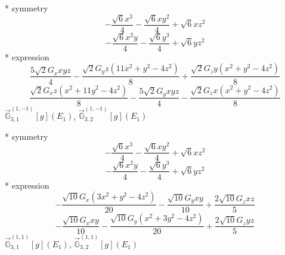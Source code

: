 \documentclass[fleqn,8pt]{jsarticle}
\begin{document}
\noindent\quad ** symmetry
\begin{dmath*}
- \frac{\sqrt{6} x^{3}}{4} - \frac{\sqrt{6} x y^{2}}{4} + \sqrt{6} x z^{2}
\end{dmath*}
\begin{dmath*}
- \frac{\sqrt{6} x^{2} y}{4} - \frac{\sqrt{6} y^{3}}{4} + \sqrt{6} y z^{2}
\end{dmath*}
\noindent\quad ** expression
\begin{dmath*}
\frac{5 \sqrt{2} G_{x} x y z}{4} - \frac{\sqrt{2} G_{y} z \left(11 x^{2} + y^{2} - 4 z^{2}\right)}{8} + \frac{\sqrt{2} G_{z} y \left(x^{2} + y^{2} - 4 z^{2}\right)}{8}
\end{dmath*}
\begin{dmath*}
\frac{\sqrt{2} G_{x} z \left(x^{2} + 11 y^{2} - 4 z^{2}\right)}{8} - \frac{5 \sqrt{2} G_{y} x y z}{4} - \frac{\sqrt{2} G_{z} x \left(x^{2} + y^{2} - 4 z^{2}\right)}{8}
\end{dmath*}
\noindent\quad $\vec{\mathbb{G}}_{3,1}^{(1,-1)}[g](E_{1})$, $\vec{\mathbb{G}}_{3,2}^{(1,-1)}[g](E_{1})$

\noindent\quad ** symmetry
\begin{dmath*}
- \frac{\sqrt{6} x^{3}}{4} - \frac{\sqrt{6} x y^{2}}{4} + \sqrt{6} x z^{2}
\end{dmath*}
\begin{dmath*}
- \frac{\sqrt{6} x^{2} y}{4} - \frac{\sqrt{6} y^{3}}{4} + \sqrt{6} y z^{2}
\end{dmath*}
\noindent\quad ** expression
\begin{dmath*}
- \frac{\sqrt{10} G_{x} \left(3 x^{2} + y^{2} - 4 z^{2}\right)}{20} - \frac{\sqrt{10} G_{y} x y}{10} + \frac{2 \sqrt{10} G_{z} x z}{5}
\end{dmath*}
\begin{dmath*}
- \frac{\sqrt{10} G_{x} x y}{10} - \frac{\sqrt{10} G_{y} \left(x^{2} + 3 y^{2} - 4 z^{2}\right)}{20} + \frac{2 \sqrt{10} G_{z} y z}{5}
\end{dmath*}
\noindent\quad $\vec{\mathbb{G}}_{3,1}^{(1,1)}[g](E_{1})$, $\vec{\mathbb{G}}_{3,2}^{(1,1)}[g](E_{1})$
\end{document}

